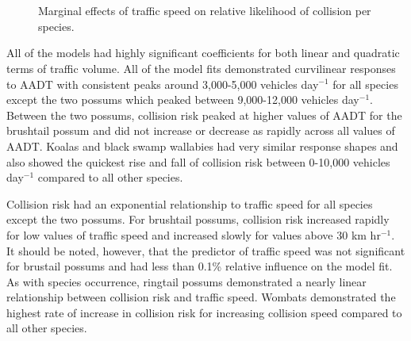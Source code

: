 \begin{figure*}[htp]
  \centering
  \\
  \\
  \caption[Marginal effects of predictor variables on relative likelihood of collision for six mammal species by season]{Marginal effects of traffic speed on relative likelihood of collision per species.}
  \label{6sp_tspd_seas}
\end{figure*}

All of the models had highly significant coefficients for both linear and quadratic terms of traffic volume.  All of the model fits demonstrated curvilinear responses to AADT with consistent peaks around 3,000-5,000 vehicles day$^{−1}$ for all species except the two possums which peaked between 9,000-12,000 vehicles day$^{−1}$. Between the two possums, collision risk peaked at higher values of AADT for the brushtail possum and did not increase or decrease as rapidly across all values of AADT.  Koalas and black swamp wallabies had very similar response shapes and also showed the quickest rise and fall of collision risk between 0-10,000 vehicles day$^{−1}$ compared to all other species.

Collision risk had an exponential relationship to traffic speed for all species except the two possums. For brushtail possums, collision risk increased rapidly for low values of traffic speed and increased slowly for values above 30 km hr$^{−1}$. It should be noted, however, that the predictor of traffic speed was not significant for brustail possums and had less than 0.1\% relative influence on the model fit. As with species occurrence, ringtail possums demonstrated a nearly linear relationship between collision risk and traffic speed. Wombats demonstrated the highest rate of increase in collision risk for increasing collision speed compared to all other species.

